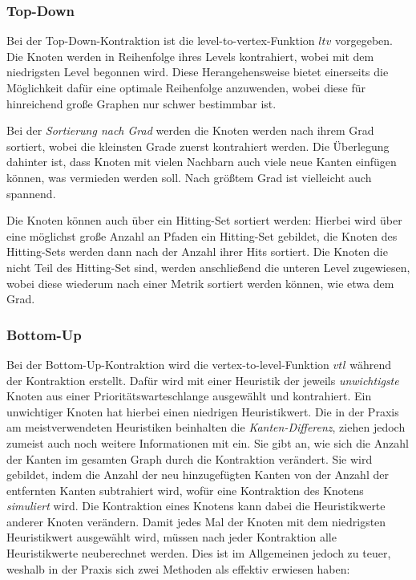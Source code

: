 \subsubsection{Top-Down}
Bei der Top-Down-Kontraktion ist die level-to-vertex-Funktion ${ltv}$ vorgegeben.
Die Knoten werden in Reihenfolge ihres Levels kontrahiert, wobei mit dem niedrigsten Level begonnen wird.
Diese Herangehensweise bietet einerseits die Möglichkeit dafür eine optimale Reihenfolge anzuwenden, wobei diese für hinreichend große Graphen nur schwer bestimmbar ist.

Bei der \emph{Sortierung nach Grad} werden die Knoten werden nach ihrem Grad sortiert, wobei die kleinsten Grade zuerst kontrahiert werden.
Die Überlegung dahinter ist, dass Knoten mit vielen Nachbarn auch viele neue Kanten einfügen können, was vermieden werden soll.
Nach größtem Grad ist vielleicht auch spannend.

Die Knoten können auch über ein Hitting-Set sortiert werden: Hierbei wird über eine möglichst große Anzahl an Pfaden ein Hitting-Set gebildet, die Knoten des Hitting-Sets werden dann nach der Anzahl ihrer Hits sortiert.
Die Knoten die nicht Teil des Hitting-Set sind, werden anschließend die unteren Level zugewiesen, wobei diese wiederum nach einer Metrik sortiert werden können, wie etwa dem Grad.

\subsubsection{Bottom-Up}

Bei der Bottom-Up-Kontraktion wird die vertex-to-level-Funktion ${vtl}$ während der Kontraktion erstellt.
Dafür wird mit einer Heuristik der jeweils \emph{unwichtigste} Knoten aus einer Prioritätswarteschlange ausgewählt und kontrahiert.
Ein unwichtiger Knoten hat hierbei einen niedrigen Heuristikwert.
Die in der Praxis am meistverwendeten Heuristiken beinhalten die \emph{Kanten-Differenz}, ziehen jedoch zumeist auch noch weitere Informationen mit ein.
Sie gibt an, wie sich die Anzahl der Kanten im gesamten Graph durch die Kontraktion verändert.
Sie wird gebildet, indem die Anzahl der neu hinzugefügten Kanten von der Anzahl der entfernten Kanten subtrahiert wird, wofür eine Kontraktion des Knotens \emph{simuliert} wird.
Die Kontraktion eines Knotens kann dabei die Heuristikwerte anderer Knoten verändern.
Damit jedes Mal der Knoten mit dem niedrigsten Heuristikwert ausgewählt wird, müssen nach jeder Kontraktion alle Heuristikwerte neuberechnet werden.
Dies ist im Allgemeinen jedoch zu teuer, weshalb in der Praxis sich zwei Methoden als effektiv erwiesen haben:

